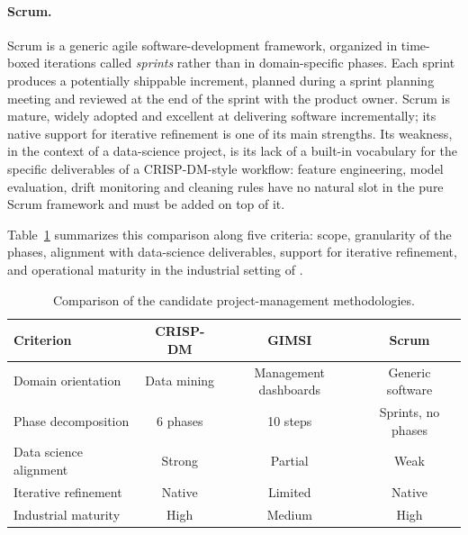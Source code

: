 \paragraph{Scrum.} Scrum is a generic agile software-development framework, organized in time-boxed iterations called \emph{sprints} rather than in domain-specific phases. Each sprint produces a potentially shippable increment, planned during a sprint planning meeting and reviewed at the end of the sprint with the product owner. Scrum is mature, widely adopted and excellent at delivering software incrementally; its native support for iterative refinement is one of its main strengths. Its weakness, in the context of a data-science project, is its lack of a built-in vocabulary for the specific deliverables of a CRISP-DM-style workflow: feature engineering, model evaluation, drift monitoring and cleaning rules have no natural slot in the pure Scrum framework and must be added on top of it.

Table~\ref{tab:method-compare} summarizes this comparison along five criteria: scope, granularity of the phases, alignment with data-science deliverables, support for iterative refinement, and operational maturity in the industrial setting of \hostorg.

\begin{table}[h]
\centering
\caption{Comparison of the candidate project-management methodologies.}
\label{tab:method-compare}
\begin{tabular}{|l|c|c|c|}
\hline
\textbf{Criterion} & \textbf{CRISP-DM} & \textbf{GIMSI} & \textbf{Scrum} \\
\hline
Domain orientation & Data mining & Management dashboards & Generic software \\
Phase decomposition & 6 phases & 10 steps & Sprints, no phases \\
Data science alignment & Strong & Partial & Weak \\
Iterative refinement & Native & Limited & Native \\
Industrial maturity & High & Medium & High \\
\hline
\end{tabular}
\end{table}

